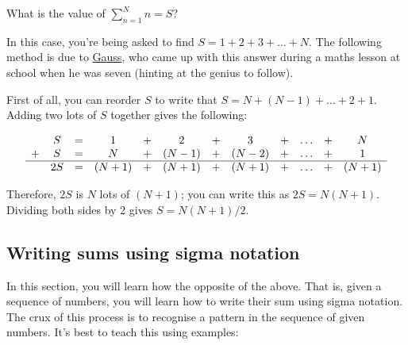\documentclass[
  12pt,
  a4paper, oneside]{starmastarticle}
\begin{document}
\begin{tcolorbox}[enhanced jigsaw, colframe=quarto-callout-note-color-frame, left=2mm, rightrule=.15mm, opacityback=0, arc=.35mm, bottomrule=.15mm, breakable, toprule=.15mm, colback=white, leftrule=.75mm]
\begin{minipage}[t]{5.5mm}
\textcolor{quarto-callout-note-color}{\faInfo}
\end{minipage}%
\begin{minipage}[t]{\textwidth - 5.5mm}
What is the value of \(\displaystyle\sum_{n=1}^N n = S\)?

In this case, you're being asked to find \(S = 1 + 2 + 3 + \ldots + N\).
The following method is due to
\href{https://mathshistory.st-andrews.ac.uk/Biographies/Gauss/}{Gauss},
who came up with this answer during a maths lesson at school when he was
seven (hinting at the genius to follow).

First of all, you can reorder \(S\) to write that
\(S = N + (N-1) + \ldots + 2 + 1\). Adding two lots of \(S\) together
gives the following:

\[
\begin{array}{cccccccccccc}
& S & = & 1 & + & 2 & + & 3 & + & \ldots & + & N \\
+ & S & = & N & + & (N-1) & + & (N-2) & + & \ldots & + & 1\\\hline
& 2S & = & (N+1) & + & (N+1) & + & (N+1) & + & \ldots & + & (N+1)
\end{array}
\]

Therefore, \(2S\) is \(N\) lots of \((N+1)\); you can write this as
\(2S = N(N+1)\). Dividing both sides by \(2\) gives
\(S = N(N+1)/2\).\end{minipage}%
\end{tcolorbox}

\hypertarget{writing-sums-using-sigma-notation}{%
\subsection{Writing sums using sigma
notation}\label{writing-sums-using-sigma-notation}}

In this section, you will learn how the opposite of the above. That is,
given a sequence of numbers, you will learn how to write their sum using
sigma notation. The crux of this process is to recognise a pattern in
the sequence of given numbers. It's best to teach this using examples:
\end{document}
